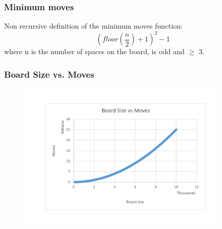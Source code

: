 \documentclass{beamer}
\begin{document}
	\begin{frame}
	\frametitle{Minimum moves}
		Non recursive definition of the minimum moves function:
		\[
			(floor(\frac{n}{2}) + 1)^2 - 1
		\]
		where n is the number of spaces on the board, is odd and $\ge$ 3.
	\end{frame}
	\begin{frame}
	\frametitle{Board Size vs. Moves}
		\begin{figure}
		\includegraphics[width = 10cm]{pegboardbvm}
		\end{figure}
	\end{frame}
\end{document}
